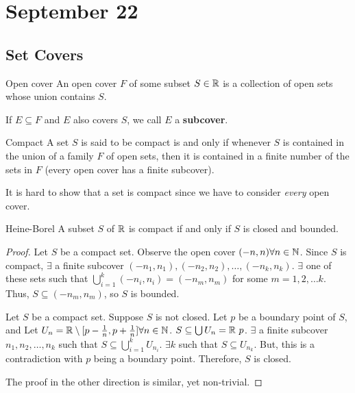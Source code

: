 \chapter{September 22}

\section{Set Covers}
\begin{definition}{Open cover}{}
    An open cover $F$ of some subset $S \in \mathbb{R}$ is a collection of open sets whose union contains $S$.
\end{definition}
\begin{note}
    If $E \subseteq F$ and $E$ also covers $S$, we call $E$ a \textbf{subcover}.
\end{note}

\begin{definition}{Compact}{}
    A set $S$ is said to be compact is and only if whenever $S$ is contained in the union of a family $F$ of open sets, then it is contained in a finite number of the sets in $F$ (every open cover has a finite subcover).
\end{definition}
\begin{note}
    It is hard to show that a set is compact since we have to consider \emph{every} open cover.
\end{note}

\begin{theorem}{Heine-Borel}{}
    A subset $S$ of $\mathbb{R}$ is compact if and only if $S$ is closed and bounded.
\end{theorem}
\begin{proof}
    Let $S$ be a compact set. Observe the open cover $(-n, n) \forall n \in \mathbb{N}$. Since $S$ is compact, $\exists$ a finite subcover $(-n_1, n_1), (-n_2, n_2), \ldots, (-n_k, n_k)$. $\exists$ one of these sets such that $\bigcup_{i=1}^k (-n_i, n_i) = (-n_m, n_m)$ for some $m = 1, 2, \ldots k$. Thus, $S \subseteq (-n_m, n_m)$, so $S$ is bounded.

    Let $S$ be a compact set. Suppose $S$ is not closed. Let $p$ be a boundary point of $S$, and Let $U_n = \mathbb{R} \setminus [p - \frac{1}{n}, p + \frac{1}{n}] \forall n \in \mathbb{N}$. $S \subseteq \bigcup U_n = \mathbb{R} \ {p}$. $\exists$ a finite subcover $n_1, n_2, \ldots, n_k$ such that $S \subseteq \bigcup_{i=1}^k U_{n_i}$. $\exists k$ such that $S \subseteq U_{n_k}$. But, this is a contradiction with $p$ being a boundary point. Therefore, $S$ is closed.

    The proof in the other direction is similar, yet non-trivial.
\end{proof}

